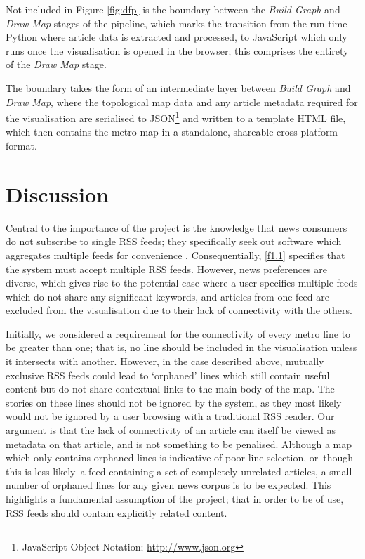 Not included in Figure \ref{fig:dfp} is the boundary between the \textit{Build Graph} and \textit{Draw Map} stages of the pipeline, which marks the transition from the run-time Python where article data is extracted and processed, to JavaScript which only runs once the visualisation is opened in the browser; this comprises the entirety of the  \textit{Draw Map} stage. 

The boundary takes the form of an intermediate layer between \textit{Build Graph} and \textit{Draw Map}, where the topological map data and any article metadata required for the visualisation are serialised to JSON\footnote{JavaScript Object Notation; \url{http://www.json.org}} and written to a template HTML file, which then contains the metro map in a standalone, shareable cross-platform format.

\section{Discussion}

Central to the importance of the project is the knowledge that news consumers do not subscribe to single RSS feeds; they specifically seek out software which aggregates multiple feeds for convenience \citep{nreader}. Consequentially, \ref{f1.1} specifies that the system must accept multiple RSS feeds. However, news preferences are diverse, which gives rise to the potential case where a user specifies multiple feeds which do not share any significant keywords, and articles from one feed are excluded from the visualisation due to their lack of connectivity with the others. 

Initially, we considered a requirement for the connectivity \citep{GeneratingInformationMaps} of every metro line to be greater than one; that is, no line should be included in the visualisation unless it intersects with another. However, in the case described above, mutually exclusive RSS feeds could lead to `orphaned' lines which still contain useful content but do not share contextual links to the main body of the map. The stories on these lines should not be ignored by the system, as they most likely would not be ignored by a user browsing with a traditional RSS reader. Our argument is that the lack of connectivity of an article can itself be viewed as metadata on that article, and is not something to be penalised. Although a map which only contains orphaned lines is indicative of poor line selection, or--though this is less likely--a feed containing a set of completely unrelated articles, a small number of orphaned lines for any given news corpus is to be expected. This highlights a fundamental assumption of the project; that in order to be of use, RSS feeds should contain explicitly related content.

